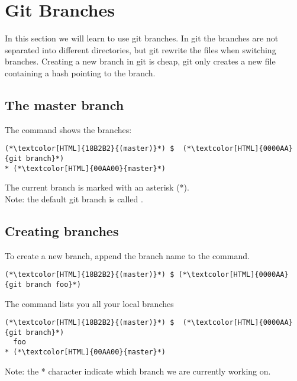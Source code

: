 \section{Git Branches}
\begin{frame}[fragile]
  \slidetitle
  In this section we will learn to use git branches.
  In git the branches are not separated into different directories, but git rewrite the files when switching branches.
  Creating a new branch in git is cheap, git only creates a new file containing a hash pointing to the branch.
\end{frame}

\subsection{The master branch}
\begin{frame}[fragile]
  \subslidetitle

  The command  shows the branches:
  \begin{lstlisting}
(*\textcolor[HTML]{18B2B2}{(master)}*) $  (*\textcolor[HTML]{0000AA}{git branch}*)
* (*\textcolor[HTML]{00AA00}{master}*)
\end{lstlisting}

  The current branch is marked with an asterisk (*).
  \\
  \vspace{1em}
  Note: the default git branch is called .

\end{frame}

\subsection{Creating branches}
\begin{frame}[fragile]
    \subslidetitle

To create a new  branch, append the branch name to the  command.
\begin{lstlisting}
(*\textcolor[HTML]{18B2B2}{(master)}*) $ (*\textcolor[HTML]{0000AA}{git branch foo}*)
\end{lstlisting}

The  command lists you all your local branches
\begin{lstlisting}
(*\textcolor[HTML]{18B2B2}{(master)}*) $  (*\textcolor[HTML]{0000AA}{git branch}*)
  foo
* (*\textcolor[HTML]{00AA00}{master}*)
\end{lstlisting}

Note: the * character indicate which branch we are currently working on.
\end{frame}

